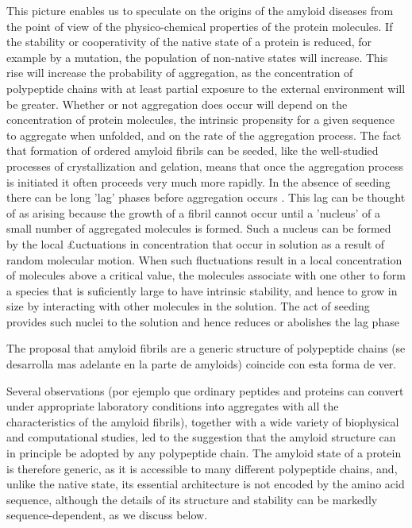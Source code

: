 This picture enables us to speculate on the origins of the amyloid diseases from the point of view of the physico-chemical properties of the protein molecules. If
the stability or cooperativity of the native state of a protein is reduced, for example by a mutation, the population of non-native states will increase.
This rise will increase the probability of aggregation, as the concentration of polypeptide chains with at least partial exposure to the external environment will be greater. Whether or not aggregation does occur will depend on
the concentration of protein molecules, the intrinsic propensity for a given sequence to aggregate when unfolded, and on the rate of the aggregation process. The
fact that formation of ordered amyloid fibrils can be seeded, like the well-studied processes of crystallization
and gelation, means that once the aggregation process is initiated it often proceeds very much more rapidly.
In the absence of seeding there can be long 'lag' phases before aggregation occurs . This lag can be thought of as arising because the growth of a fibril cannot occur until a 'nucleus' of a small number
of aggregated molecules is formed. Such a nucleus can be formed by the local £uctuations in concentration that occur in solution as a result of random molecular motion. When such fluctuations result in a local concentration of
molecules above a critical value, the molecules associate with one other to form a species that is suficiently large to have intrinsic stability, and hence to grow in size by interacting with other molecules in the solution. The act
of seeding provides such nuclei to the solution and hence reduces or abolishes the lag phase

The proposal that amyloid fibrils are a generic structure of polypeptide chains (se desarrolla mas adelante en la parte de amyloids) coincide con esta forma de ver.

Several observations (por ejemplo que ordinary peptides and proteins can convert under appropriate laboratory conditions into aggregates with all the characteristics of the amyloid fibrils),
together with a wide variety of biophysical and computational studies, led to the suggestion that the amyloid structure can in principle be adopted by any polypeptide chain.
The amyloid state of a protein is therefore generic, as it is accessible to many different polypeptide chains, and, unlike the native state, its essential architecture is not encoded by the amino acid sequence,
although the details of its structure and stability can be markedly sequence-dependent, as we discuss below. 

